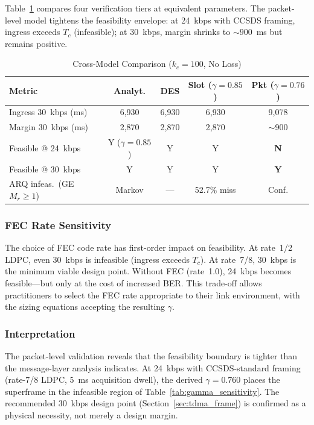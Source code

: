 \documentclass[journal]{IEEEtran}
\begin{document}
Table~\ref{tab:cross_model} compares four verification tiers at equivalent parameters. The packet-level model tightens the feasibility envelope: at 24~kbps with CCSDS framing, ingress exceeds $T_c$ (infeasible); at 30~kbps, margin shrinks to ${\sim}900$~ms but remains positive.

\begin{table}[t]
    \centering
    \caption{Cross-Model Comparison ($k_c = 100$, No Loss)}
    \label{tab:cross_model}
    \footnotesize
    \begin{tabular}{@{}lcccc@{}}
        \toprule
        \textbf{Metric} & \textbf{Analyt.} & \textbf{DES} & \textbf{Slot ($\gamma\!=\!0.85$)} & \textbf{Pkt ($\gamma\!=\!0.76$)} \\
        \midrule
        Ingress 30~kbps (ms) & 6{,}930 & 6{,}930 & 6{,}930 & 9{,}078 \\
        Margin 30~kbps (ms) & 2{,}870 & 2{,}870 & 2{,}870 & ${\sim}$900 \\
        Feasible @ 24~kbps & Y ($\gamma\!=\!0.85$) & Y & Y & \textbf{N} \\
        Feasible @ 30~kbps & Y & Y & Y & \textbf{Y} \\
        ARQ infeas.\ (GE $M_r\!\geq\!1$) & Markov & --- & 52.7\% miss & Conf. \\
        \bottomrule
    \end{tabular}
\end{table}

\subsubsection{FEC Rate Sensitivity}

The choice of FEC code rate has first-order impact on feasibility. At rate~1/2 LDPC, even 30~kbps is infeasible (ingress exceeds $T_c$). At rate~7/8, 30~kbps is the minimum viable design point. Without FEC (rate~1.0), 24~kbps becomes feasible---but only at the cost of increased BER. This trade-off allows practitioners to select the FEC rate appropriate to their link environment, with the sizing equations accepting the resulting $\gamma$.

\subsubsection{Interpretation}

The packet-level validation reveals that the feasibility boundary is tighter than the message-layer analysis indicates. At 24~kbps with CCSDS-standard framing (rate-7/8 LDPC, 5~ms acquisition dwell), the derived $\gamma = 0.760$ places the superframe in the infeasible region of Table~\ref{tab:gamma_sensitivity}. The recommended 30~kbps design point (Section~\ref{sec:tdma_frame}) is confirmed as a physical necessity, not merely a design margin.
\end{document}
